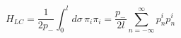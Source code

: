 \begin{equation}
\label{eq:open string H mode expansion}
     H_{LC} = \frac{1}{2p_-} \int_0^{l}\! d\sigma \, \pi_i \pi_i =
              \frac{p_-}{2l}\sum_{n=-\infty}^{\infty} p^i_n p^i_n
\end{equation}

